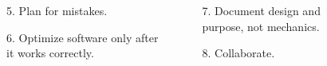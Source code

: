 \documentclass{beamer}
\begin{document}
\begin{frame}[t]
\begin{columns}
\begin{column}{.23\linewidth}
\begin{block}{}
\begin{minipage}[t][\blockheight][t]{\linewidth}
\begin{enumerate}
                    \end{enumerate}
                \end{minipage}
            \end{block}
        \end{column}
        \begin{column}{.23\linewidth}
            \begin{block}{}
                \begin{minipage}[t][\blockheight][t]{\linewidth}
                    \begin{enumerate}
                        \item[5.] Plan for mistakes.
                    \end{enumerate}
                \end{minipage}
            \end{block}
            \begin{block}{}
                \begin{minipage}[t][\blockheight][t]{\linewidth}
                    \begin{enumerate}
                        \item[6.] Optimize software only after it works correctly.
                    \end{enumerate}
                \end{minipage}
            \end{block}
        \end{column}
        \begin{column}{.23\linewidth}
            \begin{block}{}
                \begin{minipage}[t][\blockheight][t]{\linewidth}
                    \begin{enumerate}
                        \item[7.] Document design and purpose, not mechanics.
                    \end{enumerate}
                \end{minipage}
            \end{block}
            \begin{block}{}
                \begin{minipage}[t][\blockheight][t]{\linewidth}
                    \begin{enumerate}
                        \item[8.] Collaborate.

\end{enumerate}
\end{minipage}
\end{block}
\end{column}
\end{columns}
\end{frame}
\end{document}

